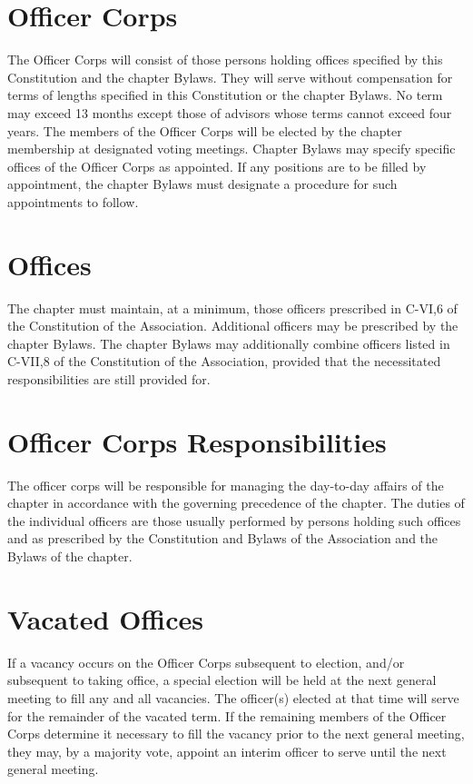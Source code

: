 \section{Officer Corps}
The Officer Corps will consist of those persons holding offices specified by this Constitution and the chapter Bylaws. They will serve without compensation for terms of lengths specified in this Constitution or the chapter Bylaws. No term may exceed 13 months except those of advisors whose terms cannot exceed four years. The members of the Officer Corps will be elected by the chapter membership at designated voting meetings. Chapter Bylaws may specify specific offices of the Officer Corps as appointed. If any positions are to be filled by appointment, the chapter Bylaws must designate a procedure for such appointments to follow.

\section{Offices} The chapter must maintain, at a minimum, those officers prescribed in C-VI,6 of the Constitution of the Association. Additional officers may be prescribed by the chapter Bylaws. The chapter Bylaws may additionally combine officers listed in C-VII,8 of the Constitution of the Association, provided that the necessitated responsibilities are still provided for.

\section{Officer Corps Responsibilities} The officer corps will be responsible for managing the day-to-day affairs of the chapter in accordance with the governing precedence of the chapter.  The duties of the individual officers are those usually performed by persons holding such offices and as prescribed by the Constitution and Bylaws of the Association and the Bylaws of the chapter.

\section{Vacated Offices} If a vacancy occurs on the Officer Corps subsequent to election, and/or subsequent to taking office, a special election will be held at the next general meeting to fill any and all vacancies. The officer(s) elected at that time will serve for the remainder of the vacated term. If the remaining members of the Officer Corps determine it necessary to fill the vacancy prior to the next general meeting, they may, by a majority vote, appoint an interim officer to serve until the next general meeting.

